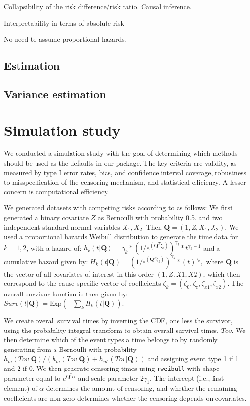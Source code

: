 \documentclass[
]{article}
\begin{document}
Collapsibility of the risk difference/risk ratio. Causal inference.

Interpretability in terms of absolute risk.

No need to assume proportional hazards.

\hypertarget{estimation}{%
\subsection{Estimation}\label{estimation}}

\hypertarget{variance-estimation}{%
\subsection{Variance estimation}\label{variance-estimation}}

\hypertarget{simulation-study}{%
\section{Simulation study}\label{simulation-study}}

We conducted a simulation study with the goal of determining which
methods should be used as the defaults in our package. The key criteria
are validity, as measured by type I error rates, bias, and confidence
interval coverage, robustness to misspecification of the censoring
mechanism, and statistical efficiency. A lesser concern is computational
efficiency.

We generated datasets with competing risks according to
\citet{beyersmann09} as follows: We first generated a binary covariate
\(Z\) as Bernoulli with probability 0.5, and two independent standard
normal variables \(X_1, X_2\). Then \(\mathbf{Q} = (1, Z, X_1, X_2)\).
We used a proportional hazards Weibull distribution to generate the time
data for \(k = 1, 2\), with a hazard of:
\(h_k(t|\mathbf{Q})= \gamma_k*(1/e^{(\mathbf{Q}^T{\zeta}_k)})^{\gamma_k}*t^{\gamma_k-1}\)
and a cumulative hazard given by:
\(H_k(t|\mathbf{Q})= (1/e^{(\mathbf{Q}^T{\zeta}_k)})^{\gamma_k}*(t)^{\gamma_k},\)
where \(\mathbf{Q}\) is the vector of all covariates of interest in this
order \((1, Z, X1,X2)\), which then correspond to the cause specific
vector of coefficients
\({\zeta}_k=(\zeta_0,\zeta_z, \zeta_{x1}, \zeta_{x2})\). The overall
survivor function is then given by:
\(Surv(t|\mathbf{Q}) = \mbox{Exp}{(-\sum_k H_k(t|\mathbf{Q}))}.\)

We create overall survival times by inverting the CDF, one less the
survivor, using the probability integral transform to obtain overall
survival times, \(Tov\). We then determine which of the event types a
time belongs to by randomly generating from a Bernoulli with probability
\(h_m(Tov|\mathbf{Q})/(h_m(Tov|\mathbf{Q})+h_{m'}(Tov|\mathbf{Q}))\) and
assigning event type 1 if 1 and 2 if 0. We then generate censoring times
using \texttt{rweibull} with shape parameter equal to
\(e^{\mathbf{Q}^T \alpha}\) and scale parameter \(2 \gamma_1\). The
intercept (i.e., first element) of \(\alpha\) determines the amount of
censoring, and whether the remaining coefficients are non-zero
determines whether the censoring depends on covariates.
\end{document}
